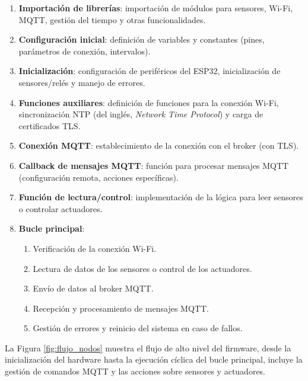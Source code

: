 \begin{enumerate}
    \item \textbf{Importación de librerías}: importación de módulos para sensores,
          Wi-Fi, MQTT, gestión del tiempo y otras funcionalidades.
    \item \textbf{Configuración inicial}: definición de variables y constantes
          (pines, parámetros de conexión, intervalos).
    \item \textbf{Inicialización}: configuración de periféricos del ESP32,
          inicialización de sensores/relés y manejo de errores.
    \item \textbf{Funciones auxiliares}: definición de funciones para la conexión Wi-Fi,
          sincronización NTP (del inglés, \textit{Network Time Protocol}) y carga de
          certificados TLS.
    \item \textbf{Conexión MQTT}: establecimiento de la conexión con el broker (con TLS).
    \item \textbf{Callback de mensajes MQTT}: función para procesar mensajes MQTT
          (configuración remota, acciones específicas).
    \item \textbf{Función de lectura/control}: implementación de la lógica para leer
          sensores o controlar actuadores.
    \item \textbf{Bucle principal}:
          \begin{enumerate}
              \item Verificación de la conexión Wi-Fi.
              \item Lectura de datos de los sensores o control de los actuadores.
              \item Envío de datos al broker MQTT.
              \item Recepción y procesamiento de mensajes MQTT.
              \item Gestión de errores y reinicio del sistema en caso de fallos.
          \end{enumerate}
\end{enumerate}


La Figura \ref{fig:flujo_nodos} muestra el flujo de alto nivel del firmware,
desde la inicialización del hardware hasta la ejecución cíclica del bucle
principal, incluye la gestión de comandos MQTT y las acciones sobre sensores y
actuadores.

